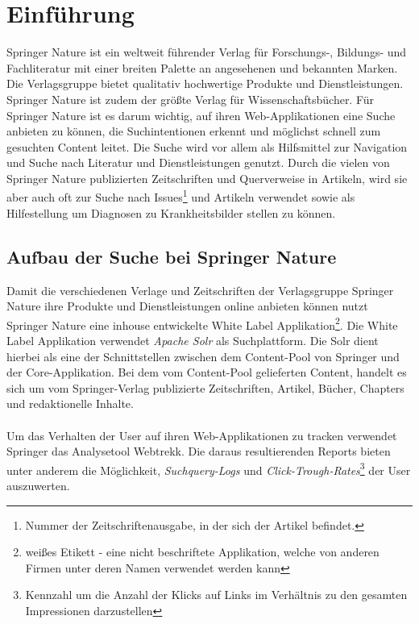 %
\chapter{Einführung}
\label{sec:Einfuehrung}

Springer Nature ist ein weltweit führender Verlag für Forschungs-, Bildungs- und Fachliteratur mit einer breiten Palette an angesehenen und bekannten Marken. Die Verlagsgruppe bietet qualitativ hochwertige Produkte und Dienstleistungen. Springer Nature ist zudem der größte Verlag für Wissenschaftsbücher. Für Springer Nature ist es darum wichtig, auf ihren Web-Applikationen eine Suche anbieten zu können, die Suchintentionen erkennt und möglichst schnell zum gesuchten Content leitet. Die Suche wird vor allem als Hilfsmittel zur Navigation und Suche nach Literatur und Dienstleistungen genutzt. Durch die vielen von Springer Nature publizierten Zeitschriften und Querverweise in Artikeln, wird sie aber auch oft zur Suche nach Issues\footnote{Nummer der Zeitschriftenausgabe, in der sich der Artikel befindet.} und Artikeln verwendet sowie als Hilfestellung um Diagnosen zu Krankheitsbilder stellen zu können.

\section{Aufbau der Suche bei Springer Nature}
\label{sec:Einfuehrung:AufbauSucheBeiSpringerNature}

Damit die verschiedenen Verlage und Zeitschriften der Verlagsgruppe Springer Nature ihre Produkte und Dienstleistungen online anbieten können nutzt Springer Nature eine inhouse entwickelte White Label Applikation\footnote{\glqq weißes Etikett\grqq{} - eine nicht beschriftete Applikation, welche von anderen Firmen unter deren Namen verwendet werden kann}. Die White Label Applikation verwendet \textit{Apache Solr} als Suchplattform. Die Solr dient hierbei als eine der Schnittstellen zwischen dem Content-Pool von Springer und der Core-Applikation. Bei dem vom Content-Pool gelieferten Content, handelt es sich um vom Springer-Verlag publizierte Zeitschriften, Artikel, Bücher, Chapters und redaktionelle Inhalte.
\\
\\
Um das Verhalten der User auf ihren Web-Applikationen zu tracken verwendet Springer das Analysetool Webtrekk. Die daraus resultierenden Reports bieten unter anderem die Möglichkeit, \textit{Suchquery-Logs} und \textit{Click-Trough-Rates}\footnote{Kennzahl um die Anzahl der Klicks auf Links im Verhältnis zu den gesamten Impressionen darzustellen} der User auszuwerten.

